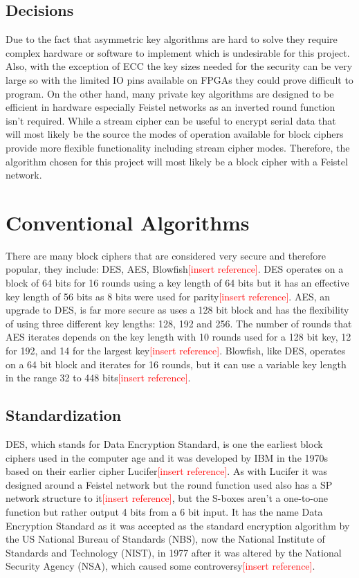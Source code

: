 \documentclass[12pt,twoside,a4paper]{report}
\begin{document}
    \subsection{Decisions}
    Due to the fact that asymmetric key algorithms are hard to solve they require complex hardware or software to implement which is undesirable for this project. Also, with the exception of ECC the key sizes needed for the security can be very large so with the limited IO pins available on FPGAs they could prove difficult to program. On the other hand, many private key algorithms are designed to be efficient in hardware especially Feistel networks as an inverted round function isn't required. While a stream cipher can be useful to encrypt serial data that will most likely be the source the modes of operation available for block ciphers provide more flexible functionality including stream cipher modes. Therefore, the algorithm chosen for this project will most likely be a block cipher with a Feistel network.
    
    \section{Conventional Algorithms}
    There are many block ciphers that are considered very secure and therefore popular, they include: DES, AES, Blowfish\textcolor{red}{[insert reference]}. DES operates on a block of 64 bits for 16 rounds using a key length of 64 bits but it has an effective key length of 56 bits as 8 bits were used for parity\textcolor{red}{[insert reference]}. AES, an upgrade to DES, is far more secure as uses a 128 bit block and has the flexibility of using three different key lengths: 128, 192 and 256. The number of rounds that AES iterates depends on the key length with 10 rounds used for a 128 bit key, 12 for 192, and 14 for the largest key\textcolor{red}{[insert reference]}. Blowfish, like DES, operates on a 64 bit block and iterates for 16 rounds, but it can use a variable key length in the range 32 to 448 bits\textcolor{red}{[insert reference]}.
    
    \subsection{Standardization}
    DES, which stands for Data Encryption Standard, is one the earliest block ciphers used in the computer age and it was developed by IBM in the 1970s based on their earlier cipher Lucifer\textcolor{red}{[insert reference]}. As with Lucifer it was designed around a Feistel network but the round function used also has a SP network structure to it\textcolor{red}{[insert reference]}, but the S-boxes aren't a one-to-one function but rather output 4 bits from a 6 bit input. It has the name Data Encryption Standard as it was accepted as the standard encryption algorithm by the US National Bureau of Standards (NBS), now the National Institute of Standards and Technology (NIST), in 1977 after it was altered by the National Security Agency (NSA), which caused some controversy\textcolor{red}{[insert reference]}.
    
\end{document}
